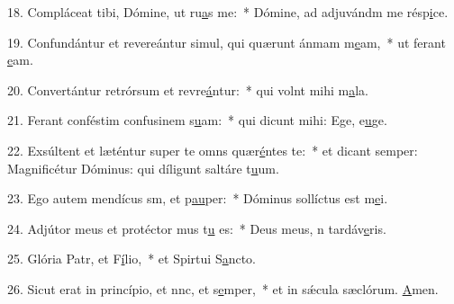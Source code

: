 18. Compláceat tibi, Dómine, ut ru\uline{a}s me:~* Dómine, ad adjuvándm me résp\uline{i}ce.\par 
19. Confundántur et revereántur simul, qui quærunt ánmam m\uline{e}am,~* ut ferant \uline{e}am.\par 
20. Convertántur retrórsum et revre\uline{á}ntur:~* qui volnt mihi m\uline{a}la.\par 
21. Ferant conféstim confusinem s\uline{u}am:~* qui dicunt mihi: Ege, e\uline{u}ge.\par 
22. Exsúltent et læténtur super te omns quær\uline{é}ntes te:~* et dicant semper: Magnificétur Dóminus: qui díligunt saltáre t\uline{u}um.\par 
23. Ego autem mendícus sm, et p\uline{au}per:~* Dóminus sollíctus est m\uline{e}i.\par 
24. Adjútor meus et protéctor mus t\uline{u} es:~* Deus meus, n tardáv\uline{e}ris.\par 
25. Glória Patr, et F\uline{í}lio,~* et Spirtui S\uline{a}ncto.\par 
26. Sicut erat in princípio, et nnc, et s\uline{e}mper,~* et in sǽcula sæclórum. \uline{A}men.\par 
